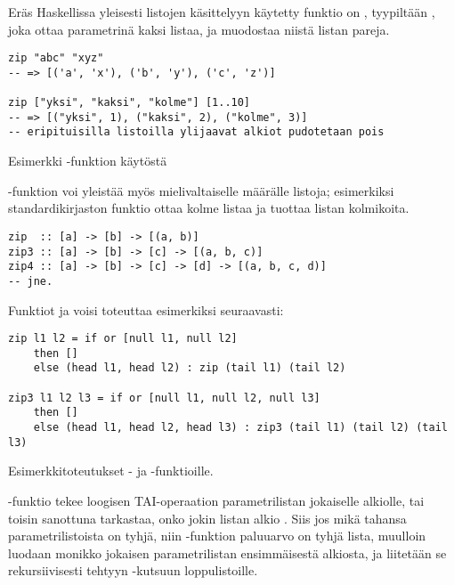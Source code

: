 Eräs Haskellissa yleisesti listojen käsittelyyn käytetty funktio on ,
tyypiltään ,
joka ottaa parametrinä kaksi listaa,
ja muodostaa niistä listan pareja.

\begin{listing}[H]
\begin{verbatim}
zip "abc" "xyz"
-- => [('a', 'x'), ('b', 'y'), ('c', 'z')]

zip ["yksi", "kaksi", "kolme"] [1..10]
-- => [("yksi", 1), ("kaksi", 2), ("kolme", 3)]
-- eripituisilla listoilla ylijaavat alkiot pudotetaan pois
\end{verbatim}
\label{lst:zip-example}
\caption{Esimerkki -funktion käytöstä}
\end{listing}

-funktion voi yleistää myös mielivaltaiselle määrälle listoja;
esimerkiksi standardikirjaston funktio  ottaa kolme listaa ja tuottaa listan kolmikoita.

\begin{verbatim}
zip  :: [a] -> [b] -> [(a, b)]
zip3 :: [a] -> [b] -> [c] -> [(a, b, c)]
zip4 :: [a] -> [b] -> [c] -> [d] -> [(a, b, c, d)]
-- jne.
\end{verbatim}

Funktiot  ja  voisi toteuttaa esimerkiksi seuraavasti:

\begin{listing}[H]
\begin{verbatim}
zip l1 l2 = if or [null l1, null l2]
    then []
    else (head l1, head l2) : zip (tail l1) (tail l2)

zip3 l1 l2 l3 = if or [null l1, null l2, null l3]
    then []
    else (head l1, head l2, head l3) : zip3 (tail l1) (tail l2) (tail l3)
\end{verbatim}
\label{lst:zip-impl}
\caption{Esimerkkitoteutukset - ja -funktioille.}
\end{listing}

-funktio  tekee loogisen TAI-operaation parametrilistan
jokaiselle alkiolle,
tai toisin sanottuna tarkastaa, onko jokin listan alkio .
Siis jos mikä tahansa parametrilistoista on tyhjä, niin -funktion paluuarvo on tyhjä lista,
muulloin luodaan monikko jokaisen parametrilistan ensimmäisestä alkiosta,
ja liitetään se rekursiivisesti tehtyyn -kutsuun loppulistoille.

